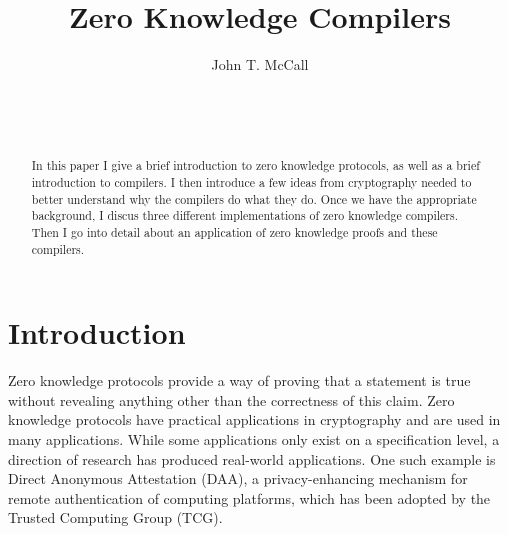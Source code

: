 \documentclass{sig-alternate}
\begin{document}

\title{Zero Knowledge Compilers}


\author{
\alignauthor
John T. McCall\\
	\\
	\\
	\\
}

\maketitle

\begin{abstract}
In this paper I give a brief introduction to zero knowledge protocols,
as well as a brief introduction to compilers. I then introduce a few
ideas from cryptography needed to better understand why the compilers do
what they do. Once we have the appropriate background, I discus three different 
implementations of zero knowledge compilers. Then I go into detail about
an application of zero knowledge proofs and these compilers.
\end{abstract}



\section{Introduction}
	Zero knowledge protocols provide a way of proving that a statement is true
	without revealing anything other than the correctness of this claim. Zero
	knowledge protocols have practical applications in cryptography and
	are used in many applications. While some applications only exist
	on a specification level, a direction of research has produced real-world
	applications. One such example is Direct Anonymous Attestation (DAA),
	a privacy-enhancing mechanism for remote authentication of computing
	platforms, which has been adopted by the Trusted Computing Group (TCG).
	
\end{document}

